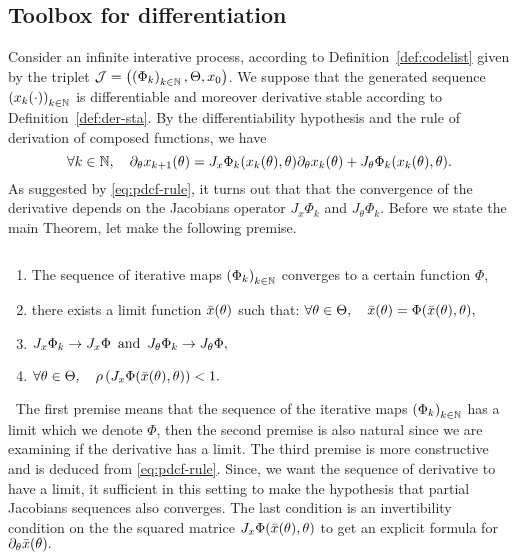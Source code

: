 \begin{appendices}
\section{Toolbox for  differentiation}\label{sec:toolbox-ad}
Consider an infinite interative process, according to Definition~\ref{def:codelist} given by the  triplet  $\mathcal{J}=\left({\left(\Phi_k\right)_{k\in\mathbb{N}},\Theta,x_{0}}\right)$. We suppose that the generated sequence $\left(x_{k}(\cdot)\right)_{k\in\mathbb{N}}$ is differentiable and moreover  derivative stable according to Definition~\ref{def:der-sta}. By the differentiability hypothesis  and the rule of derivation of composed functions, we have 
\begin{equation}\label{eq:pdcf-rule}
\forall k \in \mathbb{N}, \quad\partial_{\theta}x_{k+1}(\theta)=J_x\Phi_k(x_{k}(\theta),\theta)\partial_{\theta}x_{k}(\theta)+J_{\theta}\Phi_k(x_{k}(\theta),\theta).
\end{equation}
 As suggested by \eqref{eq:pdcf-rule}, it turns out that that the convergence of the derivative depends on the Jacobians operator $J_{x}\Phi_k$ and $J_{\theta}\Phi_k$. Before we state the main Theorem,  let make the following premise. 
 \begin{premise}\label{prem_apend} $~$
\begin{enumerate}[label=(D.\arabic*)]
 \item \label{prem_D1} The sequence of iterative maps $\left(\Phi_k\right)_{k\in\mathbb{N}}$ converges to a certain function $\Phi$,
 \item\label{prem_D2}  there exists a limit function $\bar{x}(\theta)$ such that:  $\forall \theta\in\Theta,\quad\bar{x}(\theta)=\Phi(\bar{x}(\theta), \theta),$
 \item \label{prem_D3} $J_x\Phi_k\to J_x\Phi\enskip \text{and} \enskip J_{\theta}\Phi_k\to J_{\theta}\Phi,$
 \item \label{prem_D4} $\forall\theta\in\Theta, \quad \rho\left({J_x\Phi(\bar{x}(\theta),\theta)}\right)<1.$
\end{enumerate}
\end{premise} 
\begin{remark}\label{rem:prem_apend}$~$
The first premise means that the sequence of the iterative maps $\left(\Phi_k\right)_{k\in\mathbb{N}}$
 has a limit which we denote $\Phi$, then the  second premise  is also natural since we are examining if the derivative has a limit. The third premise is more constructive and is deduced from \eqref{eq:pdcf-rule}. Since, we want the sequence of derivative to have a limit, it sufficient in this setting to make the   hypothesis that  partial Jacobians sequences  also converges. The last condition is an invertibility condition on the the squared matrice $J_{x}\Phi(\bar{x}(\theta),\theta)$ to get  an explicit formula for $\partial_{\theta}\bar{x}(\theta).$
\end{remark}
 

\end{appendices}
